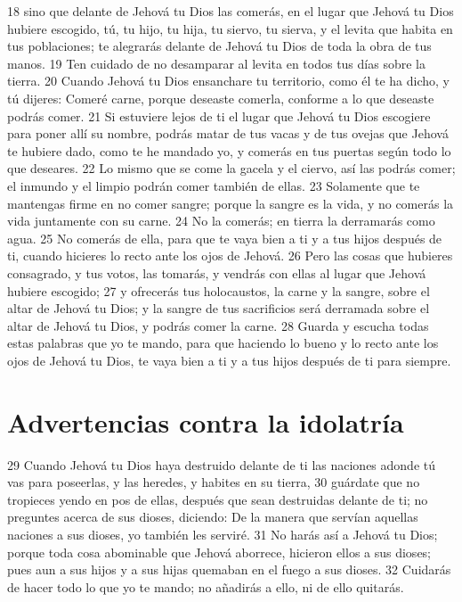 18 sino que delante de Jehová tu Dios las comerás, en el lugar que Jehová tu Dios hubiere escogido, tú, tu hijo, tu hija, tu siervo, tu sierva, y el levita que habita en tus poblaciones; te alegrarás delante de Jehová tu Dios de toda la obra de tus manos.
19 Ten cuidado de no desamparar al levita en todos tus días sobre la tierra.
20 Cuando Jehová tu Dios ensanchare tu territorio, como él te ha dicho, y tú dijeres: Comeré carne, porque deseaste comerla, conforme a lo que deseaste podrás comer.
21 Si estuviere lejos de ti el lugar que Jehová tu Dios escogiere para poner allí su nombre, podrás matar de tus vacas y de tus ovejas que Jehová te hubiere dado, como te he mandado yo, y comerás en tus puertas según todo lo que deseares.
22 Lo mismo que se come la gacela y el ciervo, así las podrás comer; el inmundo y el limpio podrán comer también de ellas.
23 Solamente que te mantengas firme en no comer sangre; porque la sangre es la vida, y no comerás la vida juntamente con su carne.
24 No la comerás; en tierra la derramarás como agua.
25 No comerás de ella, para que te vaya bien a ti y a tus hijos después de ti, cuando hicieres lo recto ante los ojos de Jehová.
26 Pero las cosas que hubieres consagrado, y tus votos, las tomarás, y vendrás con ellas al lugar que Jehová hubiere escogido;
27 y ofrecerás tus holocaustos, la carne y la sangre, sobre el altar de Jehová tu Dios; y la sangre de tus sacrificios será derramada sobre el altar de Jehová tu Dios, y podrás comer la carne.
28 Guarda y escucha todas estas palabras que yo te mando, para que haciendo lo bueno y lo recto ante los ojos de Jehová tu Dios, te vaya bien a ti y a tus hijos después de ti para siempre.

\section{Advertencias contra la idolatría}

29 Cuando Jehová tu Dios haya destruido delante de ti las naciones adonde tú vas para poseerlas, y las heredes, y habites en su tierra,
30 guárdate que no tropieces yendo en pos de ellas, después que sean destruidas delante de ti; no preguntes acerca de sus dioses, diciendo: De la manera que servían aquellas naciones a sus dioses, yo también les serviré.
31 No harás así a Jehová tu Dios; porque toda cosa abominable que Jehová aborrece, hicieron ellos a sus dioses; pues aun a sus hijos y a sus hijas quemaban en el fuego a sus dioses.
32 Cuidarás de hacer todo lo que yo te mando; no añadirás a ello, ni de ello quitarás.

